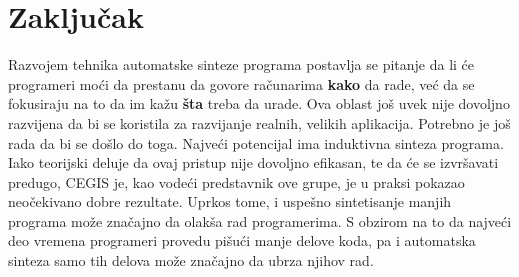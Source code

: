 \section{Zaključak}
\label{sec:zakljucak}

Razvojem tehnika automatske sinteze programa postavlja se pitanje da li će programeri moći da prestanu da govore računarima \textbf{kako} da rade, već da se fokusiraju na to da im kažu \textbf{šta} treba da urade. Ova oblast još uvek nije dovoljno razvijena da bi se koristila za razvijanje realnih, velikih aplikacija. Potrebno je još rada da bi se došlo do toga. Najveći potencijal ima induktivna sinteza programa.
Iako teorijski deluje da ovaj pristup nije dovoljno efikasan, te da će se izvršavati predugo, CEGIS je, kao vodeći predstavnik ove grupe, je u praksi pokazao neočekivano dobre rezultate. Uprkos tome, i uspešno sintetisanje manjih programa može značajno da olakša rad programerima. S obzirom na to da najveći deo vremena programeri provedu pišući manje delove koda, pa i automatska sinteza samo tih delova može značajno da ubrza njihov rad.
